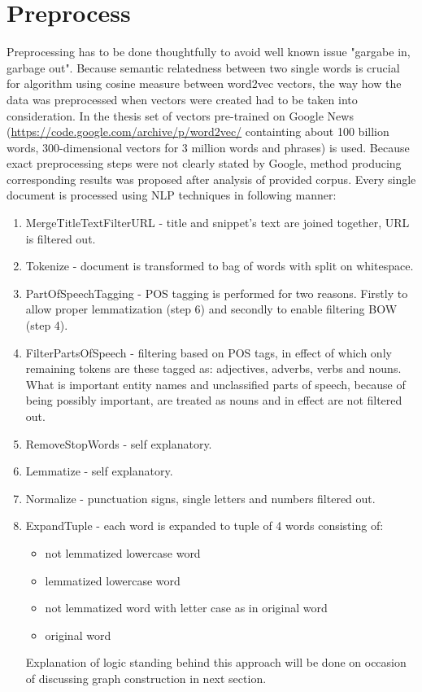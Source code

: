 \documentclass[a4paper, 12pt, oneside]{Thesis} %
\begin{document}
\section{Preprocess} Preprocessing has to be done thoughtfully to avoid well known issue "gargabe in, garbage out". Because semantic relatedness between two single words is crucial for algorithm using cosine measure between word2vec vectors, the way how the data was preprocessed when vectors were created had to be taken into consideration. In the thesis set of vectors pre-trained on Google News (\url{https://code.google.com/archive/p/word2vec/} containting about 100 billion words, 300-dimensional vectors for 3 million words and phrases) is used. Because exact preprocessing steps were not clearly stated by Google, method producing corresponding results was proposed after analysis of provided corpus. Every single document is processed using NLP techniques in following manner:

\begin{enumerate}
\item MergeTitleTextFilterURL - title and snippet's text are joined together, URL is filtered out.
\item Tokenize - document is transformed to bag of words with split on whitespace.
\item PartOfSpeechTagging - POS tagging is performed for two reasons. Firstly to allow proper lemmatization (step 6) and secondly to enable filtering BOW (step 4).
\item FilterPartsOfSpeech - filtering based on POS tags, in effect of which only remaining tokens are these tagged as: adjectives, adverbs, verbs and nouns. What is important entity names and unclassified parts of speech, because of being possibly important, are treated as nouns and in effect are not filtered out.
\item RemoveStopWords - self explanatory.
\item Lemmatize - self explanatory.
\item Normalize - punctuation signs, single letters and numbers filtered out.
\item ExpandTuple - each word is expanded to tuple of 4 words consisting of:
\begin{itemize}
\item not lemmatized lowercase word
\item lemmatized lowercase word
\item not lemmatized word with letter case as in original word
\item original word
\end{itemize}
Explanation of logic standing behind this approach will be done on occasion of discussing graph construction in next section.
\end{enumerate}
\end{document}
